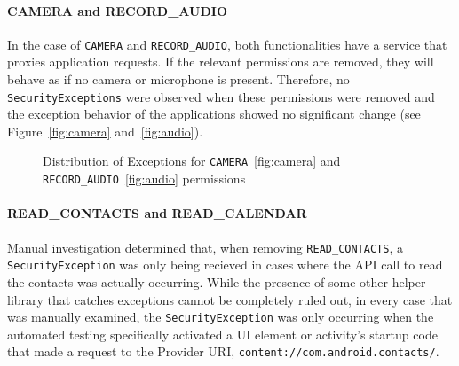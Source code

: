 \paragraph{{\bfseries \ttfamily CAMERA} and {\bfseries \ttfamily RECORD\_AUDIO}}
In the case of \texttt{CAMERA} and \texttt{RECORD\_AUDIO}, both functionalities have a service that proxies application requests.  If the relevant permissions are removed, they will behave as if no camera or microphone is present.  Therefore, no \texttt{SecurityExceptions} were observed when these permissions were removed and the exception behavior of the applications showed no significant change (see Figure~\ref{fig:camera} and~\ref{fig:audio}).
\begin{figure}[h!]
\hfill
{}
\hfill
{}
\hfill
\caption{Distribution of Exceptions for \texttt{CAMERA}~\ref{fig:camera} and \texttt{RECORD\_AUDIO}~\ref{fig:audio} permissions}
\end{figure}

\paragraph{{\bfseries \ttfamily READ\_CONTACTS} and {\bfseries \ttfamily READ\_CALENDAR}}
Manual investigation determined that, when removing \texttt{READ\_CONTACTS}, a \texttt{SecurityException} was only being recieved in cases where the API call to read the contacts was actually occurring. While the presence of some other helper library that catches exceptions cannot be completely ruled out, in every case that was manually examined, the \texttt{SecurityException} was only occurring when the automated testing specifically activated a UI element or activity's startup code that made a request to the Provider URI, \texttt{content://com.android.contacts/}. 

